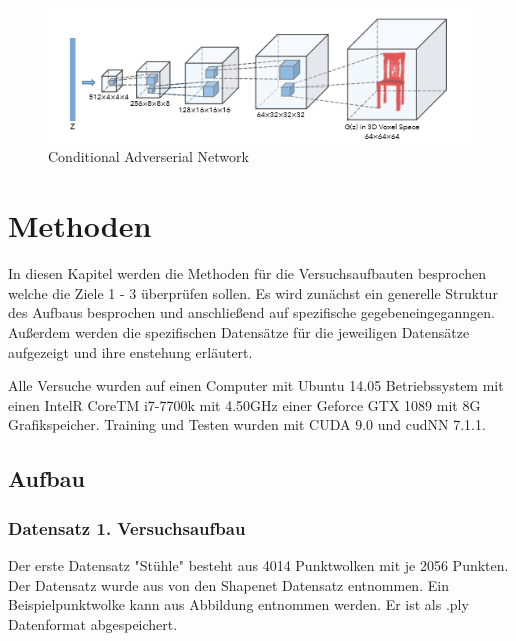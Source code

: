 \documentclass{llncs}
\begin{document}
\begin{figure}[htbp] 
	\centering
	\includegraphics[width=1.2\textwidth]{3dgan.png}
	\caption{Conditional Adverserial Network}
	\label{fig:Bild2}
\end{figure}
\cite{3d}

\section{Methoden}
In diesen Kapitel werden die Methoden für die Versuchsaufbauten besprochen welche die Ziele 1 - 3 überprüfen sollen. Es wird zunächst ein generelle Struktur des Aufbaus besprochen und anschließend auf spezifische gegebeneingeganngen. Außerdem werden die spezifischen Datensätze für die jeweiligen Datensätze aufgezeigt und ihre enstehung erläutert. 


Alle Versuche wurden auf einen Computer mit Ubuntu 14.05 Betriebssystem mit einen IntelR CoreTM i7-7700k mit 4.50GHz einer Geforce GTX 1089 mit 8G Grafikspeicher. Training und Testen wurden mit CUDA 9.0 und cudNN 7.1.1.


\subsection{Aufbau}
\subsubsection{Datensatz 1. Versuchsaufbau}
Der erste Datensatz "Stühle" besteht aus 4014 Punktwolken mit je 2056 Punkten. Der Datensatz wurde aus von den Shapenet Datensatz entnommen. Ein Beispielpunktwolke kann aus Abbildung entnommen werden. Er ist als .ply Datenformat abgespeichert. 
\end{document}
